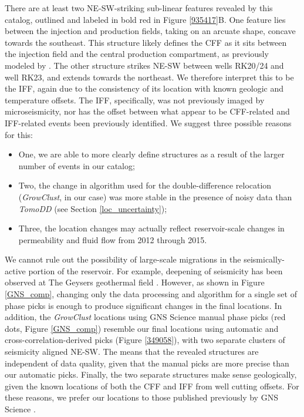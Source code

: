 There are at least two NE-SW-striking sub-linear features revealed by this catalog, outlined and labeled in bold red in Figure \ref{935417}B. One feature lies between the injection and production fields, taking on an arcuate shape, concave towards the southeast. This structure likely defines the \acrshort{CFF} as it sits between the injection field and the central production compartment, as previously modeled by \citet{wallis2013}. The other structure strikes NE-SW between wells RK20/24 and well RK23, and extends towards the northeast. We therefore interpret this to be the \acrshort{IFF}, again due to the consistency of its location with known geologic and temperature offsets. The \acrshort{IFF}, specifically, was not previously imaged by microseismicity, nor has the offset between what appear to be \acrshort{CFF}-related and \acrshort{IFF}-related events \citep{Sherburn_2015} been previously identified. We suggest three possible reasons for this:
\begin{itemize}
    \item One, we are able to more clearly define structures as a result of the larger number of events in our catalog;
    \item Two, the change in algorithm used for the double-difference relocation (\textit{GrowClust}, in our case) was more stable in the presence of noisy data than \textit{TomoDD} (see Section \ref{loc_uncertainty});
    \item Three, the location changes may actually reflect reservoir-scale changes in \gls{permeability} and fluid flow from 2012 through 2015.
\end{itemize}
We cannot rule out the possibility of large-scale migrations in the seismically-active portion of the reservoir. For example, deepening of seismicity has been observed at The Geysers geothermal field \citep[e.g.][]{Mart_nez_Garz_n_2014,Jeanne_2015tensor}. However, as shown in Figure \ref{GNS_comp}, changing only the data processing and algorithm for a single set of phase picks is enough to produce significant changes in the final locations. In addition, the \textit{GrowClust} locations using GNS Science manual phase picks (red dots, Figure \ref{GNS_comp}) resemble our final locations using automatic and cross-correlation-derived picks (Figure \ref{349058}), with two separate clusters of seismicity aligned NE-SW. The means that the revealed structures are independent of data quality, given that the manual picks are more precise than our automatic picks. Finally, the two separate structures make sense geologically, given the known locations of both the \acrshort{CFF} and \acrshort{IFF} from well cutting offsets. For these reasons, we prefer our locations to those published previously by GNS Science \citep{Sherburn_2015}.

